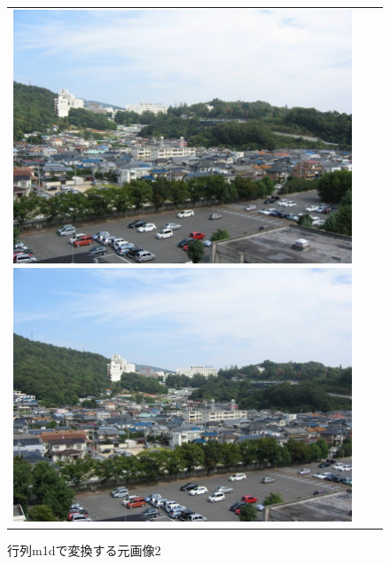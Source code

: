 \documentclass[a4j]{jarticle}
\begin{document}
\begin{figure}[htbp]
\begin{tabular}{ccc}
\begin{minipage}{0.3\hsize}
\center
\includegraphics[bb=0 0 768 576,scale=.15]{../2/0.jpg}
\caption{行列m0dで変換する元画像1}
\end{minipage}
\begin{minipage}{0.3\hsize}
\center
\includegraphics[bb=0 0 768 576,scale=.15]{../2/1.jpg}
\caption{行列m1dで変換する元画像2}
\end{minipage}
\begin{minipage}{0.4\hsize}
\center

\end{minipage}
\end{tabular}
\end{figure}
\end{document}
